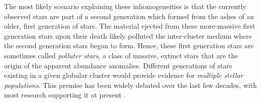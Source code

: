 


The most likely scenario explaining these inhomogeneities is that the currently observed stars are part of a second generation which formed from the ashes of an older, first generation of stars. The material ejected from these more-massive first generation stars upon their death likely polluted the inter-cluster medium where the second generation stars began to form. Hence, these first generation stars are sometimes called \emph{polluter stars}, a class of massive, extinct stars that are the origin of the apparent abundance anomalies. Different generations of stars existing in a given globular cluster would provide evidence for \emph{multiple stellar populations}. This premise has been widely debated over the last few decades, with most research supporting it at present \cite{Gratton2004,Gratton2012,Gratton2019}.


